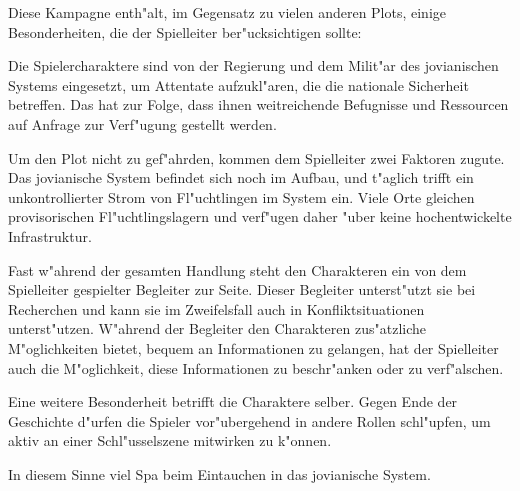 Diese Kampagne enth"alt, im Gegensatz zu vielen anderen Plots, einige Besonderheiten, die der Spielleiter ber"ucksichtigen sollte:

Die Spielercharaktere sind von der Regierung und dem Milit"ar des jovianischen Systems eingesetzt, um Attentate aufzukl"aren, die die nationale Sicherheit betreffen. Das hat zur Folge, dass ihnen weitreichende Befugnisse und Ressourcen auf Anfrage zur Verf"ugung gestellt werden.

Um den Plot nicht zu gef"ahrden, kommen dem Spielleiter zwei Faktoren zugute. Das jovianische System befindet sich noch im Aufbau, und t"aglich trifft ein unkontrollierter Strom von Fl"uchtlingen im System ein. Viele Orte gleichen provisorischen Fl"uchtlingslagern und verf"ugen daher "uber keine hochentwickelte Infrastruktur.

Fast w"ahrend der gesamten Handlung steht den Charakteren ein von dem Spielleiter gespielter Begleiter zur Seite. Dieser Begleiter unterst"utzt sie bei Recherchen und kann sie im Zweifelsfall auch in Konfliktsituationen unterst"utzen. W"ahrend der Begleiter den Charakteren zus"atzliche M"oglichkeiten bietet, bequem an Informationen zu gelangen, hat der Spielleiter auch die M"oglichkeit, diese Informationen zu beschr"anken oder zu verf"alschen.

Eine weitere Besonderheit betrifft die Charaktere selber. Gegen Ende der Geschichte d"urfen die Spieler vor"ubergehend in andere Rollen schl"upfen, um aktiv an einer Schl"usselszene mitwirken zu k"onnen.

\vspace{1.5cm}
\begin{center}{\large{}In diesem Sinne viel Spa\3 beim Eintauchen in das jovianische System.}\end{center}

